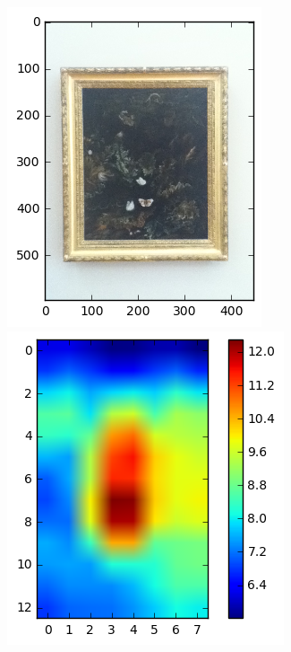 \begin{figure}[!htb]
  \begin{minipage}[c]{.33\linewidth}
    \includegraphics[width=\linewidth]{figures/sample2_5P-0508.png}
  \end{minipage} \hfill
  \begin{minipage}[c]{.33\linewidth}
    \includegraphics[width=\linewidth]{figures/sample2_heatmap.png}

\end{minipage}
\end{figure}
